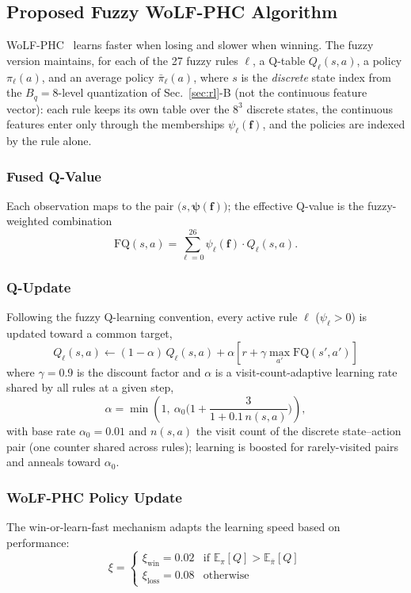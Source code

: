 \documentclass[10pt,conference]{IEEEtran}
\newcommand{\vect}[1]{\mathbf{#1}}
\newcommand{\E}{\mathbb{E}}
\begin{document}
\subsection{Proposed Fuzzy WoLF-PHC Algorithm}

WoLF-PHC~\cite{bowling2002wolf} learns faster when losing and slower when winning. The fuzzy version maintains, for each of the 27 fuzzy rules $\ell$, a Q-table $Q_\ell(s,a)$, a policy $\pi_\ell(a)$, and an average policy $\bar{\pi}_\ell(a)$, where $s$ is the \emph{discrete} state index from the $B_q=8$-level quantization of Sec.~\ref{sec:rl}-B (not the continuous feature vector): each rule keeps its own table over the $8^3$ discrete states, the continuous features enter only through the memberships $\psi_\ell(\vect{f})$, and the policies are indexed by the rule alone.

\subsubsection{Fused Q-Value}
Each observation maps to the pair $\big(s, \bm{\psi}(\vect{f})\big)$; the effective Q-value is the fuzzy-weighted combination
\begin{equation}
\text{FQ}(s, a) = \sum_{\ell=0}^{26}\psi_\ell(\vect{f}) \cdot Q_\ell(s, a).
\label{eq:fused_q}
\end{equation}

\subsubsection{Q-Update}
Following the fuzzy Q-learning convention, every active rule $\ell$ ($\psi_\ell > 0$) is updated toward a common target,
\begin{equation}
Q_\ell(s,a) \leftarrow (1-\alpha)\,Q_\ell(s,a) + \alpha\left[r + \gamma\max_{a'}\text{FQ}(s',a')\right]
\label{eq:q_update}
\end{equation}
where $\gamma = 0.9$ is the discount factor and $\alpha$ is a visit-count-adaptive learning rate shared by all rules at a given step,
\begin{equation}
\alpha = \min\!\left(1,\ \alpha_0\Big(1 + \frac{3}{1+0.1\,n(s,a)}\Big)\right),
\label{eq:alpha_adaptive}
\end{equation}
with base rate $\alpha_0=0.01$ and $n(s,a)$ the visit count of the discrete state--action pair (one counter shared across rules); learning is boosted for rarely-visited pairs and anneals toward $\alpha_0$.

\subsubsection{WoLF-PHC Policy Update}
The win-or-learn-fast mechanism adapts the learning speed based on performance:
\begin{equation}
\xi = \begin{cases}
\xi_{\text{win}} = 0.02 & \text{if } \E_\pi[Q] > \E_{\bar{\pi}}[Q] \\
\xi_{\text{loss}} = 0.08 & \text{otherwise}
\end{cases}
\label{eq:wolf}
\end{equation}
\end{document}
